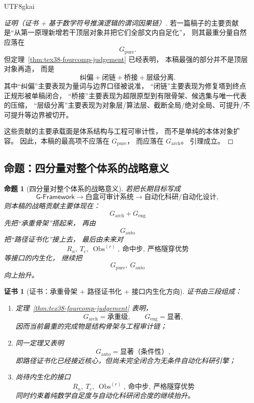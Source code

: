 \documentclass[12pt]{article}
\newtheorem{proposition}{命题}[section]
\newtheorem{Certificate}{证书}[section]
\newcommand{\GFramework}{\textsf{G-Framework}}
\newcommand{\Obs}{\operatorname{Obs}}
\begin{document}
\begin{CJK*}{UTF8}{gkai}
\begin{proof}[证明（证书 + 基于数学符号推演逻辑的谓词因果链）]
若一篇稿子的主要贡献是“从第一原理新增若干顶层对象并把它们全部文内自足化”，
则其最重分量自然应落在
\[
  G_{\mathrm{pure}}.
\]
但定理~\ref{thm:tex38-fourcomp-judgement} 已经表明，
本稿最强的部分并不是顶层对象再造，
而是
\[
  \text{纠偏}
  +
  \text{闭链}
  +
  \text{桥接}
  +
  \text{层级分离}.
\]
其中“纠偏”主要表现为量词与边界口径被说准，
“闭链”主要表现为修复塔到终点正规形被单稿闭合，
“桥接”主要表现为超限原型到有限骨架、候选集与唯一代表的压缩，
“层级分离”主要表现为对象层/算法层、截断全局/绝对全局、可提升/不可提升等边界被切开。

这些贡献的主要承载面是体系结构与工程可审计性，
而不是单纯的本体对象扩容。
因此，本稿的最高项不应落在 $G_{\mathrm{pure}}$，
而应落在 $G_{\mathrm{arch}}$。
引理成立。
\end{proof}

\subsection{命题：四分量对整个体系的战略意义}
\label{subsec:tex38-fourcomp-proposition}

\begin{proposition}[四分量对整个体系的战略意义]
\label{prop:tex38-fourcomp-strategy}
若把长期目标写成
\[
  \GFramework
  \to
  \text{白盒可审计系统}
  \to
  \text{自动化科研/自动化设计},
\]
则本稿的战略贡献主要体现在：
\[
  G_{\mathrm{arch}}+G_{\mathrm{eng}}
\]
先把“承重骨架”搭起来，
再由
\[
  G_{\mathrm{auto}}
\]
把“路径证书化”接上去，
最后由未来对
\[
  R_n,\ T_e,\ \Obs^{(r)},\ \text{命中步},\ \text{严格隧穿优势}
\]
等接口的内生化，
继续把
\[
  G_{\mathrm{pure}},\ G_{\mathrm{auto}}
\]
向上抬升。
\end{proposition}

\begin{Certificate}[证书：承重骨架 + 路径证书化 + 接口内生化方向]
\label{cert:tex38-fourcomp-strategy}
证书由三段组成：
\begin{enumerate}
  \item 定理~\ref{thm:tex38-fourcomp-judgement} 表明，
  \[
    G_{\mathrm{arch}}=\text{承重级},
    \qquad
    G_{\mathrm{eng}}=\text{显著},
  \]
  因而当前最重的完成物是结构骨架与工程审计链；
  \item 同一定理又表明
  \[
    G_{\mathrm{auto}}=\text{显著（条件性）},
  \]
  即路径证书化已经接近核心，但尚未完全闭合为无条件自动化科研引擎；
  \item 尚待内生化的接口
  \[
    R_n,\ T_e,\ \Obs^{(r)},\ \text{命中步},\ \text{严格隧穿优势}
  \]
  同时约束着纯数学自足度与自动化科研闭合度的继续抬升。
\end{enumerate}
\end{Certificate}


\end{CJK*}
\end{document}
